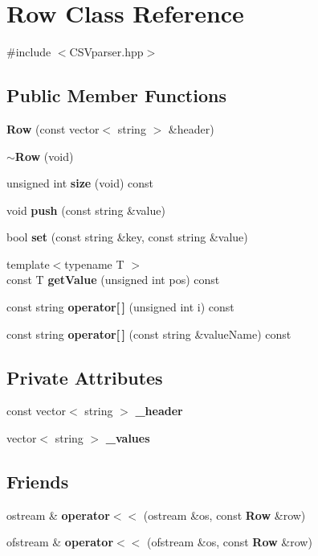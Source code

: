 \section{Row Class Reference}
\label{class_row}


{\ttfamily \#include $<$C\+S\+Vparser.\+hpp$>$}

\subsection*{Public Member Functions}
\begin{DoxyCompactItemize}
\item 
\textbf{ Row} (const vector$<$ string $>$ \&header)
\item 
\textbf{ $\sim$\+Row} (void)
\item 
unsigned int \textbf{ size} (void) const
\item 
void \textbf{ push} (const string \&value)
\item 
bool \textbf{ set} (const string \&key, const string \&value)
\item 
{\footnotesize template$<$typename T $>$ }\\const T \textbf{ get\+Value} (unsigned int pos) const
\item 
const string \textbf{ operator[$\,$]} (unsigned int i) const
\item 
const string \textbf{ operator[$\,$]} (const string \&value\+Name) const
\end{DoxyCompactItemize}
\subsection*{Private Attributes}
\begin{DoxyCompactItemize}
\item 
const vector$<$ string $>$ \textbf{ \+\_\+header}
\item 
vector$<$ string $>$ \textbf{ \+\_\+values}
\end{DoxyCompactItemize}
\subsection*{Friends}
\begin{DoxyCompactItemize}
\item 
ostream \& \textbf{ operator$<$$<$} (ostream \&os, const \textbf{ Row} \&row)
\item 
ofstream \& \textbf{ operator$<$$<$} (ofstream \&os, const \textbf{ Row} \&row)
\end{DoxyCompactItemize}


